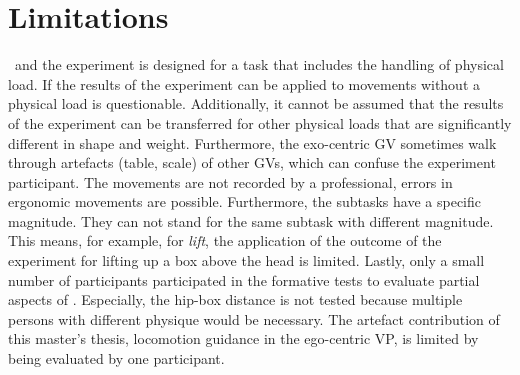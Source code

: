 \section{Limitations}
\label{sec:limitations}
\exgo\ and the experiment is designed for a task that includes the handling of physical load. If the results of the experiment can be applied to movements without a physical load is questionable. Additionally, it cannot be assumed that the results of the experiment can be transferred for other physical loads that are significantly different in shape and weight. Furthermore, the exo-centric GV sometimes walk through artefacts (table, scale) of other GVs, which can confuse the experiment participant. The movements are not recorded by a professional, errors in ergonomic movements are possible. Furthermore, the subtasks have a specific magnitude. They can not stand for the same subtask with different magnitude. This means, for example, for \textit{lift}, the application of the outcome of the experiment for lifting up a box above the head is limited. Lastly, only a small number of participants participated in the formative tests to evaluate partial aspects of \exgo. Especially, the hip-box distance is not tested because multiple persons with different physique would be necessary. The artefact contribution of this master's thesis, locomotion guidance in the ego-centric VP, is limited by being evaluated by one participant.\\



